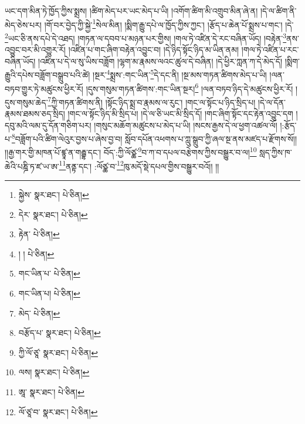 ཡང་དག་མིན་ཏེ་ཁྱོད་ཀྱིས་སྨྲས། །ཚིག་མེད་པར་ཡང་མེད་པ་ཡི། །འགོག་ཚིག་མི་འགྲུབ་མིན་ཞེ་ན། །དེ་ལ་ཚིག་ནི་མེད་ཅེས་པར། །གོ་བར་བྱེད་ཀྱི་སྐྱེ་\footnote{སྐྱེས་  སྣར་ཐང་།  པེ་ཅིན། }སེལ་མིན། །སྨིག་རྒྱུ་དཔེ་ལ་ཁྱོད་ཀྱིས་ཀྱང་། །རྩོད་པ་ཆེན་པོ་སྨྲས་པ་གང་། །དེ་\footnote{དེར་  སྣར་ཐང་།  པེ་ཅིན། }ཡང་ཅི་ནས་དཔེ་དེ་འཐད། །གཏན་ལ་དབབ་པ་མཉན་པར་གྱིས། །གལ་ཏེ་འཛིན་དེ་རང་བཞིན་ཡོད། །བརྟེན་\footnote{རྟེན་  པེ་ཅིན། }ནས་འབྱུང་བར་མི་འགྱུར་རོ། །འཛིན་པ་གང་ཞིག་བརྟེན་འབྱུང་བ། །དེ་ཉིད་སྟོང་ཉིད་མ་ཡིན་ནམ། །གལ་ཏེ་འཛིན་པ་རང་བཞིན་ཡོད། །འཛིན་པ་དེ་ལ་སུ་ཡིས་བཟློག །ལྷག་མ་རྣམས་ལའང་ཚུལ་དེ་བཞིན། །དེ་ཕྱིར་ཀླན་ཀ་དེ་མེད་དོ། །སྨིག་རྒྱུའི་དཔེས་བཟློག་བསྒྲུབ་པའི་ཚེ། །སྔར་\footnote{། །  པེ་ཅིན། }སྨྲས་:གང་ཡིན་\footnote{གང་ཡིན་པ་  པེ་ཅིན། }དེ་དང་ནི། །སྔ་མས་གཏན་ཚིགས་མེད་པ་ཡི། །ལན་བཏབ་གྱུར་ཏེ་མཚུངས་ཕྱིར་རོ། །དུས་གསུམ་གཏན་ཚིགས་:གང་ཡིན་སྔར།\footnote{གང་ཡིན་པ།  པེ་ཅིན། } །ལན་བཏབ་ཉིད་དེ་མཚུངས་ཕྱིར་རོ། །དུས་གསུམ་ཆེད་\footnote{མེད་  པེ་ཅིན། }ཀྱི་གཏན་ཚིགས་ནི། །སྟོང་ཉིད་སྨྲ་བ་རྣམས་ལ་རུང་། །གང་ལ་སྟོང་པ་ཉིད་སྲིད་པ། །དེ་ལ་དོན་རྣམས་ཐམས་ཅད་སྲིད། །གང་ལ་སྟོང་ཉིད་མི་སྲིད་པ། །དེ་ལ་ཅི་ཡང་མི་སྲིད་དོ། །གང་ཞིག་སྟོང་དང་རྟེན་འབྱུང་དག །དབུ་མའི་ལམ་དུ་དོན་གཅིག་པར། །གསུང་མཆོག་མཚུངས་པ་མེད་པ་ཡི། །སངས་རྒྱས་དེ་ལ་ཕྱག་འཚལ་ལོ། །:རྩོད་པ་\footnote{བརྩོད་པ་  སྣར་ཐང་།  པེ་ཅིན། }བཟློག་པའི་ཚིག་ལེའུར་བྱས་པ་ཞེས་བྱ་བ། སློབ་དཔོན་འཕགས་པ་ཀླུ་སྒྲུབ་ཀྱི་ཞལ་སྔ་ནས་མཛད་པ་རྫོགས་སོ།། །།རྒྱ་གར་གྱི་མཁན་པོ་ཛྙཱ་ན་གརྦྷ་དང་། བོད་:ཀྱི་ལོཙྪ་\footnote{ཀྱི་ལོ་ཙཱ་  སྣར་ཐང་།  པེ་ཅིན། }བ་ཀ་བ་དཔལ་བརྩེགས་ཀྱིས་བསྒྱུར་བ་ལ།\footnote{ལས།  སྣར་ཐང་།  པེ་ཅིན། } སླད་ཀྱིས་ཁ་ཆེའི་པཎྜི་ཏ་ཛ་ཡ་ཨ་\footnote{ཨཱ་  སྣར་ཐང་།  པེ་ཅིན། }ནནྟ་དང་། :ལོཙྪ་བ་\footnote{ལོ་ཙཱ་བ་  སྣར་ཐང་།  པེ་ཅིན། }ཁུ་མདོ་སྡེ་དཔལ་གྱིས་བསྒྱུར་བའོ།། །།